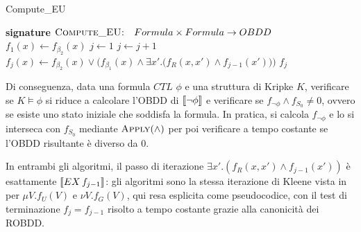 \begin{algorithmdesc}{Compute\_EU}
  \begin{algorithmic}[1]
    \Statex{} \textbf{signature} \(\textsc{Compute\_EU:} \quad Formula \times Formula \to OBDD\)
    \State{} \(f_1(x) \gets f_{\beta_2}(x)\)
    \State{} \(j \gets 1\)
    \Repeat{}
    \State{} \(j \gets j+1\)
    \State{} \(f_j(x) \gets f_{\beta_2}(x) \lor \Big(f_{\beta_1}(x) \land \exists x'.\big(f_R(x,x') \land f_{j-1}(x')\big)\Big)\)
    \State{} \Return{} \(f_j\)
    \EndFunction{}
  \end{algorithmic}
\end{algorithmdesc}

Di conseguenza, data una formula \(CTL\) \(\phi\) e una struttura di Kripke \(K\), verificare se \(K \models \phi\) si riduce a calcolare l'OBDD di \(\den{\neg\phi}\) e verificare se \(f_{\neg\phi} \land f_{S_0} \neq 0\), ovvero se esiste uno stato iniziale che soddisfa la formula. In pratica, si calcola \(f_{\neg\phi}\) e lo si interseca con \(f_{S_0}\) mediante \(\textsc{Apply}(\land)\) per poi verificare a tempo costante se l'OBDD risultante è diverso da \(0\).

\begin{note}{}
  In entrambi gli algoritmi, il passo di iterazione \(\exists x'.(f_R(x,x')\land f_{j-1}(x'))\) è esattamente \(\den{EX\,f_{j-1}}\): gli algoritmi sono la stessa iterazione di Kleene vista in~ per \(\mu V.f_U(V)\) e \(\nu V.f_G(V)\), qui resa esplicita come pseudocodice, con il test di terminazione \(f_j=f_{j-1}\) risolto a tempo costante grazie alla canonicità dei ROBDD.
\end{note}
